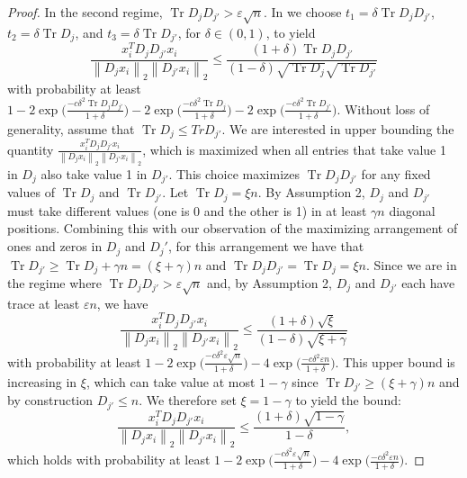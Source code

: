 \documentclass{article} %
\newcommand{\twonorm}[1]{\left\|#1\right\|_{2}}
\DeclareMathOperator{\Tr}{Tr}
\newcommand{\n}{\ensuremath{n}}
\newcommand{\1}{\ensuremath{{\sf (i)}}}
\newcommand{\2}{\ensuremath{{\sf (ii)}}}
\newcommand{\3}{\ensuremath{{\sf (iii)}}}
\newcommand{\4}{\ensuremath{{\sf (iv)}}}
\newcommand{\5}{\ensuremath{{\sf (v)}}}
\newcommand{\6}{\ensuremath{{\sf (vi)}}}
\begin{document}
\begin{proof}
In the second regime, $\Tr{D_jD_{j'}} > \varepsilon \sqrt{\n}$. In  we choose $t_1 = \delta\Tr{D_jD_{j'}}$, $t_2 = \delta\Tr{D_j}$, and $t_3 = \delta \Tr{D_{j'}}$, for $\delta \in (0,1)$, to yield
\begin{equation*}
\frac{x_i^TD_jD_{j'}x_i}{\twonorm{D_jx_i}\twonorm{D_{j'}x_i}} \leq \frac{(1+\delta)\Tr{D_jD_{j'}}}{(1-\delta)\sqrt{\Tr{D_j}}\sqrt{\Tr{D_{j'}}}}
\end{equation*}
with probability at least $1 - 2\exp{\big(\frac{-c\delta^2\Tr{D_jD_{j'}}}{1+\delta}\big)} - 2\exp{\big(\frac{-c\delta^2\Tr{D_j}}{1+\delta}\big)} - 2\exp{\big(\frac{-c\delta^2\Tr{D_{j'}}}{1+\delta}\big)}$.
Without loss of generality, assume that $\Tr{D_j} \leq Tr{D_{j'}}$.
We are interested in upper bounding the quantity $\frac{x_i^TD_jD_{j'}x_i}{\twonorm{D_jx_i}\twonorm{D_{j'}x_i}}$, which is maximized when all entries that take value 1 in $D_j$ also take value 1 in $D_{j'}$. This choice maximizes $\Tr{D_jD_{j'}}$ for any fixed values of $\Tr{D_j}$ and $\Tr{D_{j'}}$. 
Let $\Tr{D_j} = \xi \n$.
By Assumption 2, $D_j$ and $D_{j'}$ must take different values (one is 0 and the other is 1) in at least $\gamma \n$ diagonal positions. Combining this with our observation of the maximizing arrangement of ones and zeros in $D_j$ and $D_j'$, for this arrangement we have that $\Tr{D_{j'}} \geq \Tr{D_j} + \gamma\n = (\xi + \gamma)\n$ and $\Tr{D_jD_{j'}} = \Tr{D_j} = \xi\n$. Since we are in the regime where $\Tr{D_jD_{j'}} > \varepsilon \sqrt{\n}$ and, by Assumption 2, $D_j$ and $D_{j'}$ each have trace at least $\varepsilon \n$, we have
\begin{equation*}
\frac{x_i^TD_jD_{j'}x_i}{\twonorm{D_jx_i}\twonorm{D_{j'}x_i}} \leq \frac{(1+\delta)\sqrt{\xi}}{(1-\delta)\sqrt{\xi + \gamma}}
\end{equation*}
with probability at least $1 - 2\exp{\big(\frac{-c\delta^2\varepsilon\sqrt{\n}}{1+\delta}\big)} - 4\exp{\big(\frac{-c\delta^2\varepsilon\n}{1+\delta}\big)}$.
This upper bound is increasing in $\xi$, which can take value at most $1 - \gamma$ since $\Tr{D_{j'}} \geq (\xi + \gamma)\n$ and by construction $D_{j'} \leq \n$. We therefore set $\xi = 1 - \gamma$ to yield the bound:
\begin{equation*}
\frac{x_i^TD_jD_{j'}x_i}{\twonorm{D_jx_i}\twonorm{D_{j'}x_i}} \leq \frac{(1+\delta)\sqrt{1-\gamma}}{1-\delta} ,
\end{equation*}
which holds with probability at least $1 - 2\exp{\big(\frac{-c\delta^2\varepsilon\sqrt{\n}}{1+\delta}\big)} - 4\exp{\big(\frac{-c\delta^2\varepsilon\n}{1+\delta}\big)}$.

\end{proof}
\end{document}
